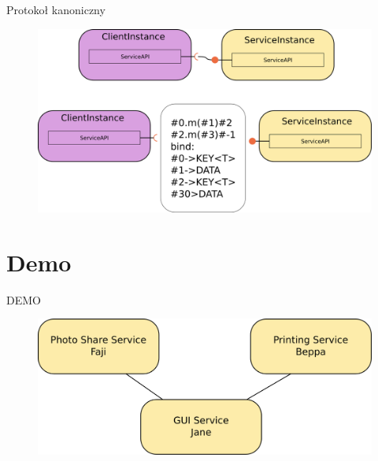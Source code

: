 \documentclass[smaller]{beamer}
\begin{document}
\begin{frame}{Protokoł kanoniczny}
\begin{figure}
 \centering
 \includegraphics[width=1\textwidth]{canonicalSplit}
 \label{fig:serviceImplementation}
\end{figure}
\end{frame}

\section{Demo}
\begin{frame}{DEMO}
\begin{figure}
 \centering
 \includegraphics[width=1\textwidth]{aouthScenario}
 \label{fig:serviceImplementation}
\end{figure}
\end{frame}

\end{document}
